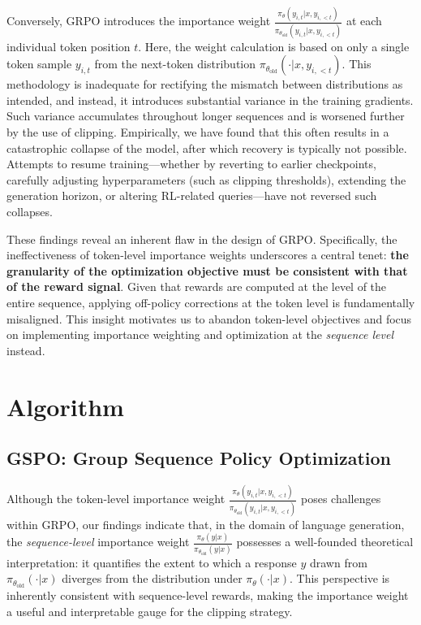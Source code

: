 Conversely, GRPO introduces the importance weight $\frac{ \pi_{\theta} (y_{i,t} | x, y_{i,<t}) }{ \pi_{\theta_\text{old}} (y_{i,t} | x,y_{i,<t})}$ at each individual token position $t$. Here, the weight calculation is based on only a single token sample $y_{i,t}$ from the next-token distribution $\pi_{\theta_\text{old}}( \cdot | x, y_{i, <t})$. This methodology is inadequate for rectifying the mismatch between distributions as intended, and instead, it introduces substantial variance in the training gradients. Such variance accumulates throughout longer sequences and is worsened further by the use of clipping. Empirically, we have found that this often results in a catastrophic collapse of the model, after which recovery is typically not possible. Attempts to resume training—whether by reverting to earlier checkpoints, carefully adjusting hyperparameters (such as clipping thresholds), extending the generation horizon, or altering RL-related queries—have not reversed such collapses.

These findings reveal an inherent flaw in the design of GRPO. Specifically, the ineffectiveness of token-level importance weights underscores a central tenet: \textbf{the granularity of the optimization objective must be consistent with that of the reward signal}. Given that rewards are computed at the level of the entire sequence, applying off-policy corrections at the token level is fundamentally misaligned. This insight motivates us to abandon token-level objectives and focus on implementing importance weighting and optimization at the \textit{sequence level} instead.

\section{Algorithm}

\subsection{GSPO: Group Sequence Policy Optimization}

Although the token-level importance weight $\frac{ \pi_{\theta} (y_{i,t} | x, y_{i,<t}) }{ \pi_{\theta_\text{old}} (y_{i,t} | x,y_{i,<t})}$ poses challenges within GRPO, our findings indicate that, in the domain of language generation, the \textit{sequence-level} importance weight $\frac{ \pi_{\theta} (y | x) }{ \pi_{\theta_\text{old}} (y | x)}$ possesses a well-founded theoretical interpretation: it quantifies the extent to which a response $y$ drawn from $\pi_{\theta_\text{old}} (\cdot | x)$ diverges from the distribution under $\pi_{\theta} (\cdot | x)$. This perspective is inherently consistent with sequence-level rewards, making the importance weight a useful and interpretable gauge for the clipping strategy.


